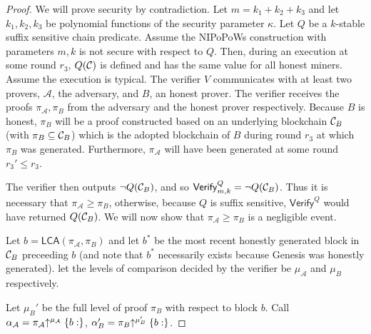 \begin{proof}
    We will prove security by contradiction.  Let $m = k_1 + k_2 + k_3$ and let
    $k_1, k_2, k_3$ be polynomial functions of the security parameter $\kappa$.
    Let $Q$ be a $k$-stable suffix sensitive chain predicate. Assume the
    NIPoPoWs construction with parameters $m, k$ is not secure with respect to
    $Q$. Then, during an execution at some round $r_3$, $Q(\mathcal{C})$ is defined
    and has the same value for all honest miners.  Assume the execution is
    typical. The verifier $V$ communicates with at least two provers,
    $\mathcal{A}$, the adversary, and $B$, an honest prover.  The verifier
    receives the proofs $\pi_\mathcal{A}, \pi_B$ from the adversary
    and the honest prover respectively. Because $B$ is
    honest, $\pi_B$ will be a proof constructed based on an underlying
    blockchain $\mathcal{C}_B$ (with $\pi_B \subseteq \mathcal{C}_B$) which is the adopted blockchain of $B$ during round
    $r_3$ at which $\pi_B$ was generated. Furthermore,
    $\pi_\mathcal{A}$ will have been generated at some round $r_3' \leq
    r_3$.

    The verifier then outputs $\lnot Q(\mathcal{C}_B)$, and so
    $\textsf{Verify}^Q_{m,k} = \lnot Q(\mathcal{C}_B)$. Thus it is necessary that
    $\pi_\mathcal{A} \geq \pi_B$, otherwise, because $Q$
    is suffix sensitive, $\textsf{Verify}^Q$ would have returned $Q(\mathcal{C}_B)$.
    We will now show that $\pi_\mathcal{A} \geq \pi_B$ is
    a negligible event.

    Let $b = \textsf{LCA}(\pi_\mathcal{A}, \pi_B)$ and let $b^*$ be
    the most recent honestly generated block in $\mathcal{C}_B$ preceeding $b$ (and note that $b^*$ necessarily exists because Genesis was honestly generated).
    let the levels of comparison decided by the verifier be $\mu_\mathcal{A}$
    and $\mu_B$ respectively.

    Let $\mu_B'$ be the full level of proof $\pi_B$ with respect to block
    $b$. Call $\alpha_\mathcal{A} =
    \pi_\mathcal{A}\negthickspace\uparrow^{\mu_\mathcal{A}}\{b:\}$,
    $\alpha'_B = \pi_B\negthickspace\uparrow^{\mu_B'}\{b:\}$.


%


\end{proof}
